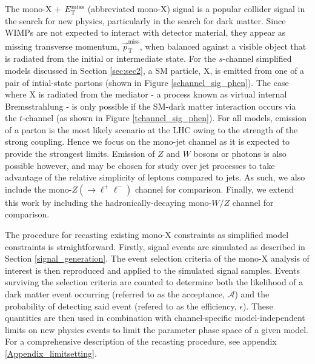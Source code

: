 The mono-X + $E_{\mathrm{T}}^{\mathrm{miss}}$ (abbreviated mono-X) signal is a popular collider signal in the search for new physics, particularly in the search for dark matter. Since WIMPs are not expected to interact with detector material, they appear as missing transverse momentum, $\vec{p}_{\mathrm{T}}^{\mathrm{miss}}$, when balanced against a visible object that is radiated from the initial or intermediate state.
For the $s$-channel simplified models discussed in Section \ref{sec:sec2}, a SM particle, X, is emitted from one of a pair of intial-state partons (shown in Figure \ref{schannel_sig_phen}). The case where X is radiated from the mediator - a process known as virtual internal Bremsstrahlung - is only possible if the SM-dark matter interaction occurs via the $t$-channel (as shown in Figure \ref{tchannel_sig_phen}).
For all models, emission of a parton is the most likely scenario at the LHC owing to the strength of the strong coupling. Hence we focus on the mono-jet channel as it is expected to provide the strongest limits. Emission of $Z$ and $W$ bosons or photons is also possible however, and may be chosen for study over jet processes to take advantage of the relative simplicity of leptons compared to jets. As such, we also include the mono-$Z(\rightarrow \ell^+ \ell^-)$ channel for comparison. Finally, we extend this work by including the hadronically-decaying mono-$W/Z$ channel for comparison.




The procedure for recasting existing mono-X constraints as simplified model constraints is straightforward. Firstly, signal events are simulated as described in Section \ref{signal_generation}. The event selection criteria of the mono-X analysis of interest is then reproduced and applied to the simulated signal samples. Events surviving the selection criteria are counted to determine both the likelihood of a dark matter event occurring (referred to as the acceptance, $\mathcal{A}$) and the probability of detecting said event (refered to as the efficiency, $\epsilon$). These quantities are then used in combination with channel-specific model-independent limits on new physics events to limit the parameter phase space of a given model.
For a comprehensive description of the recasting procedure, see appendix \ref{Appendix_limitsetting}.


